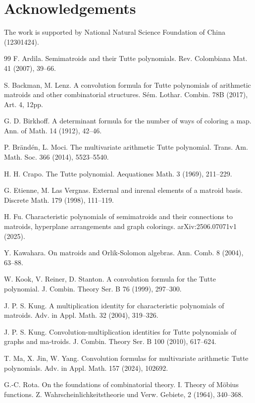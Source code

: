 \documentclass[12pt]{article}%
\numberwithin{equation}{section}
\begin{document}
\section*{Acknowledgements}
The work is supported by National Natural Science Foundation of China (12301424).
\begin{thebibliography}{99}\setlength{\itemsep}{-.0mm}
F. Ardila. Semimatroids and their Tutte polynomials. Rev. Colombiana Mat. 41 (2007), 39--66.

S. Backman, M. Lenz. A convolution formula for Tutte polynomials of arithmetic matroids and other combinatorial structures. S\'em.
Lothar. Combin. 78B (2017), Art. 4, 12pp.

G. D. Birkhoff. A determinant formula for the number of ways of coloring a map. Ann. of Math. 14 (1912), 42--46.

P. Br\"and\'en, L. Moci. The multivariate arithmetic Tutte polynomial. Trans. Am. Math. Soc. 366 (2014), 5523--5540.

H. H. Crapo. The Tutte polynomial. Aequationes Math. 3 (1969), 211--229.

G. Etienne, M. Las Vergnas. External and inrenal elements of a matroid basis. Discrete Math. 179 (1998), 111--119.

H. Fu. Characteristic polynomials of semimatroids and their connections to matroids, hyperplane arrangements and graph colorings. arXiv:2506.07071v1 (2025).

Y. Kawahara. On matroids and Orlik-Solomon algebras. Ann. Comb. 8 (2004), 63--88.

W. Kook, V. Reiner, D. Stanton. A convolution formula for the Tutte polynomial. J. Combin. Theory Ser. B 76 (1999), 297--300.

J. P. S. Kung. A multiplication identity for characteristic polynomials of matroids. Adv. in Appl. Math. 32 (2004), 319--326.

J. P. S. Kung. Convolution-multiplication identities for Tutte polynomials of graphs and ma-troids. J. Combin. Theory Ser. B 100 (2010), 617--624.

T. Ma, X. Jin, W. Yang. Convolution formulas for multivariate arithmetic Tutte polynomials. Adv. in Appl. Math. 157 (2024), 102692.

G.-C. Rota. On the foundations of combinatorial theory. I. Theory of M\"{o}bius functions. Z. Wahrscheinlichkeitstheorie und Verw. Gebiete, 2 (1964), 340--368.


\end{thebibliography}
\end{document}
